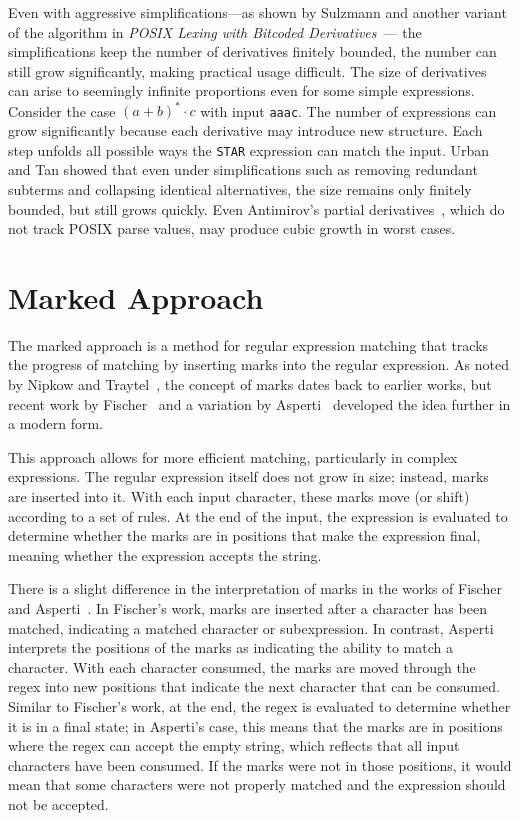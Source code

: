 \documentclass[12pt]{article}
\begin{document}
Even with aggressive simplifications—as shown by Sulzmann and another variant of the algorithm in \emph{POSIX Lexing with Bitcoded Derivatives}~\cite{TanAndUrban2023}— 
the simplifications keep the number of derivatives finitely bounded, the number can still grow significantly, making practical usage difficult.
The size of derivatives can arise to seemingly infinite proportions even for some simple expressions. Consider the case \( (a + b)^* \cdot c \)
with input \texttt{aaac}. The number of expressions can grow significantly because each derivative may introduce new structure. Each step 
unfolds all possible ways the \texttt{STAR} expression can match the input. Urban and Tan showed that even under simplifications such as 
removing redundant subterms and collapsing identical alternatives, the size remains only finitely bounded, but still grows quickly.
Even Antimirov’s partial derivatives~\cite{Antimirov1996}, which do not track POSIX parse values, may produce cubic growth in worst cases.

\section{Marked Approach}
The marked approach is a method for regular expression matching that tracks the progress of matching by inserting marks into the regular expression. 
As noted by Nipkow and Traytel~\cite{NipkowTraytel2014}, the concept of marks dates back to earlier works, but recent work by Fischer~\cite{Fischer2010} 
and a variation by Asperti~\cite{Asperti2010} developed the idea further in a modern form.

This approach allows for more efficient matching, particularly in complex expressions. The regular expression
itself does not grow in size; instead, marks are inserted into it. With each input character, these marks move (or shift) according to a set of rules.
At the end of the input, the expression is evaluated to determine whether the marks are in positions that make the expression final, meaning whether 
the expression accepts the string.
 
There is a slight difference in the interpretation of marks in the works of Fischer~\cite{Fischer2010} and Asperti~\cite{Asperti2010}.
In Fischer's work, marks are inserted after a character has been matched, indicating a matched character or subexpression. 
In contrast, Asperti interprets the positions of the marks as indicating the ability to match a character. With each character consumed,
the marks are moved through the regex into new positions that indicate the next character that can be consumed. Similar to Fischer’s work,
at the end, the regex is evaluated to determine whether it is in a final state; in Asperti’s case, this means that the marks are in positions 
where the regex can accept the empty string, which reflects that all input characters have been consumed. If the marks were not in those positions,
it would mean that some characters were not properly matched and the expression should not be accepted.
\end{document}
